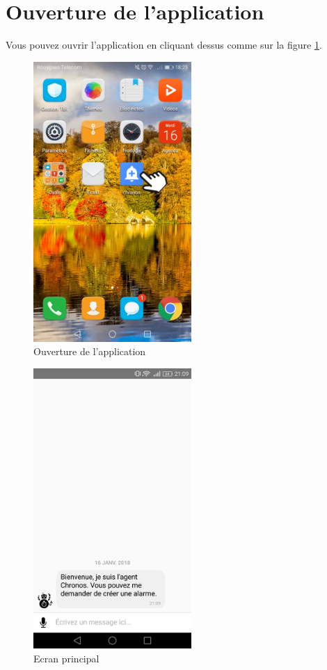 \section{Ouverture de l'application}

Vous pouvez ouvrir l'application en cliquant dessus comme sur la figure \ref{A}.

\begin{figure}[H]
  \centering
  \includegraphics[width=6cm]{images/A.png}
  \caption{Ouverture de l'application}
  \label{A}
\end{figure}

\begin{figure}[H]
  \centering
  \includegraphics[width=6cm]{images/B1.png}
  \caption{Ecran principal}
  \label{B1}
\end{figure}

